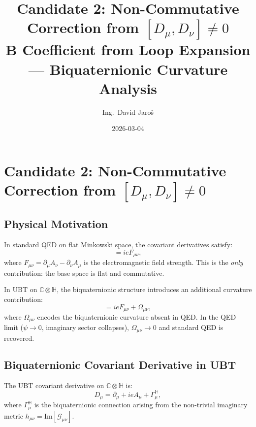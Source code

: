 \documentclass[11pt,a4paper]{article}
\title{Candidate 2: Non-Commutative Correction from
    \texorpdfstring{$[D_\mu, D_\nu] \neq 0$}{[D,D] != 0}\\
    \large B Coefficient from Loop Expansion — Biquaternionic Curvature Analysis}
\author{Ing.\ David Jaroš}
\date{2026-03-04}
\theoremstyle{remark}
\begin{document}
  \maketitle
\fi

\section{Candidate 2: Non-Commutative Correction from
  \texorpdfstring{$[D_\mu,D_\nu]\neq 0$}{[D,D] != 0}}
\label{sec:candidate2_noncommutative}

\subsection{Physical Motivation}

In standard QED on flat Minkowski space, the covariant derivatives satisfy:
\begin{equation}
  [D_\mu, D_\nu] = i e F_{\mu\nu},
  \label{eq:QED_commutator}
\end{equation}
where $F_{\mu\nu} = \partial_\mu A_\nu - \partial_\nu A_\mu$ is the electromagnetic field
strength. This is the \emph{only} contribution: the base space is flat and commutative.

In UBT on $\mathbb{C} \otimes \mathbb{H}$, the biquaternionic structure introduces an additional
curvature contribution:
\begin{equation}
  [D_\mu, D_\nu] = i e F_{\mu\nu} + \Omega_{\mu\nu},
  \label{eq:UBT_commutator}
\end{equation}
where $\Omega_{\mu\nu}$ encodes the biquaternionic curvature absent in QED. In the QED limit
($\psi \to 0$, imaginary sector collapses), $\Omega_{\mu\nu} \to 0$ and standard QED is recovered.

\subsection{Biquaternionic Covariant Derivative in UBT}

The UBT covariant derivative on $\mathbb{C} \otimes \mathbb{H}$ is:
\begin{equation}
  D_\mu = \partial_\mu + i e A_\mu + \Gamma_\mu^{\mathbb{H}},
  \label{eq:UBT_D}
\end{equation}
where $\Gamma_\mu^{\mathbb{H}}$ is the biquaternionic connection arising from the non-trivial
imaginary metric $h_{\mu\nu} = \mathrm{Im}[\mathcal{G}_{\mu\nu}]$.
\end{document}
